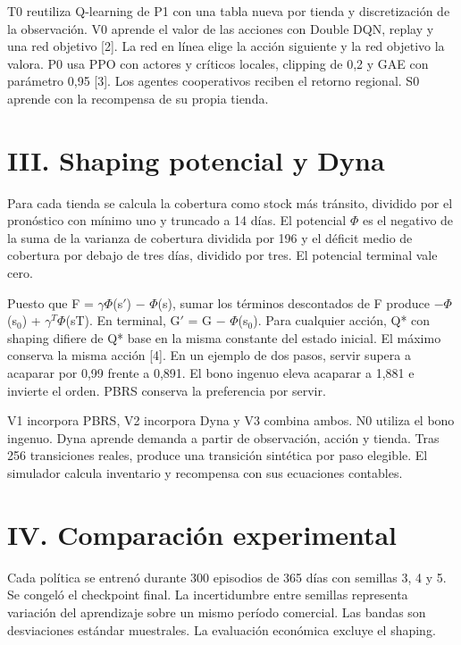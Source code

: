 \documentclass[conference]{IEEEtran}
\begin{document}
T0 reutiliza Q-learning de P1 con una tabla nueva por tienda y discretización de la observación. V0 aprende el valor de las acciones con Double DQN, replay y una red objetivo [2]. La red en línea elige la acción siguiente y la red objetivo la valora. P0 usa PPO con actores y críticos locales, clipping de 0,2 y GAE con parámetro 0,95 [3]. Los agentes cooperativos reciben el retorno regional. S0 aprende con la recompensa de su propia tienda.

\section*{III. Shaping potencial y Dyna}
Para cada tienda se calcula la cobertura como stock más tránsito, dividido por el pronóstico con mínimo uno y truncado a 14 días. El potencial $\Phi$ es el negativo de la suma de la varianza de cobertura dividida por 196 y el déficit medio de cobertura por debajo de tres días, dividido por tres. El potencial terminal vale cero.

Puesto que F = $\gamma$$\Phi$(s$'$) $-$ $\Phi$(s), sumar los términos descontados de F produce $-$$\Phi$(s$_0$) + $\gamma$$^{T}$$\Phi$(sT). En terminal, G$'$ = G $-$ $\Phi$(s$_0$). Para cualquier acción, Q* con shaping difiere de Q* base en la misma constante del estado inicial. El máximo conserva la misma acción [4]. En un ejemplo de dos pasos, servir supera a acaparar por 0,99 frente a 0,891. El bono ingenuo eleva acaparar a 1,881 e invierte el orden. PBRS conserva la preferencia por servir.

V1 incorpora PBRS, V2 incorpora Dyna y V3 combina ambos. N0 utiliza el bono ingenuo. Dyna aprende demanda a partir de observación, acción y tienda. Tras 256 transiciones reales, produce una transición sintética por paso elegible. El simulador calcula inventario y recompensa con sus ecuaciones contables.

\section*{IV. Comparación experimental}
Cada política se entrenó durante 300 episodios de 365 días con semillas 3, 4 y 5. Se congeló el checkpoint final. La incertidumbre entre semillas representa variación del aprendizaje sobre un mismo período comercial. Las bandas son desviaciones estándar muestrales. La evaluación económica excluye el shaping.
\end{document}
